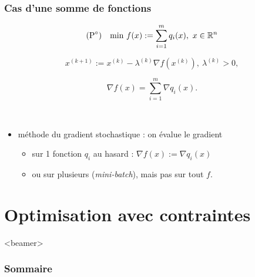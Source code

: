 \documentclass{beamer}
\newcommand{\R}{{\ensuremath\mathbb{R}}}
\begin{document}
\begin{frame}
  \frametitle{Cas d'une somme de fonctions}

  \[
  (\text{P}^\circ) \quad
    \text{min} \ f(x) := \sum_{i = 1}^{m} q_i(x), \ x \in \R^n
  \]

  \[ x^{(k+1)} := x^{(k)} - \lambda^{(k)} {\nabla f}(x^{(k)}), \ \lambda^{(k)} > 0, \]

  \[ {\nabla f}(x) = \sum_{i = 1}^{m} {\nabla q_i}(x). \]

  ~
  
  \begin{itemize}
  \item méthode du gradient stochastique : on évalue le gradient
    \begin{itemize}
    \item sur 1 fonction $q_i$ au hasard : ${\nabla f}(x) := {\nabla q_i}(x)$
    \item ou sur plusieurs (\emph{mini-batch}), mais pas sur tout $f$.
    \end{itemize}
  \end{itemize}
  
\end{frame}

\section{Optimisation avec contraintes}

\begin{frame}<beamer>
  \frametitle{Sommaire}
  \tableofcontents[currentsection]
\end{frame}
\end{document}
